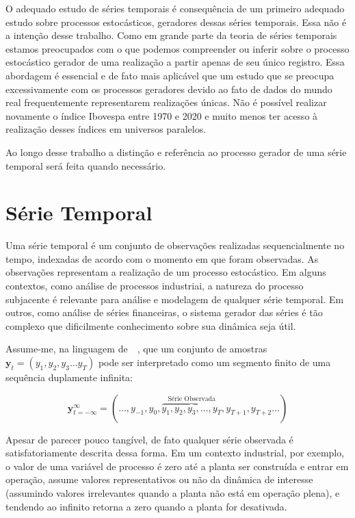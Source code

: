 O adequado estudo de séries temporais é consequência de um primeiro adequado
estudo sobre processos estocásticos, geradores dessas séries temporais. Essa
não é a intenção desse trabalho. Como em grande parte da teoria de séries
temporais estamos preocupados com o que podemos compreender ou inferir sobre
o processo estocástico gerador de uma realização a partir apenas de seu único
registro. Essa abordagem é essencial e de fato mais aplicável que um estudo
que se preocupa excessivamente com os processos geradores devido ao fato de dados
do mundo real frequentemente representarem realizações únicas. Não é possível
realizar novamente o índice Ibovespa entre 1970 e 2020 e muito menos ter acesso
à realização desses índices em universos paralelos.

Ao longo desse trabalho a distinção e referência ao processo gerador de uma série
temporal será feita quando necessário.


\section{Série Temporal}\label{ssec:definition}

Uma série temporal é um conjunto de observações realizadas sequencialmente no
tempo, indexadas de acordo com o momento em que foram observadas. As
observações representam a realização de um processo estocástico. Em alguns
contextos, como análise de processos industriai, a natureza do processo
subjacente é relevante para análise e modelagem de qualquer série temporal. Em
outros, como análise de séries financeiras, o sistema gerador das séries é tão
complexo que dificilmente conhecimento sobre sua dinâmica seja útil.

Assume-me, na linguagem de~~\cite{hamilton}, que um conjunto de amostras
$\mathbf{y}_t = (y_1, y_2, y_3 \dots y_T)$ pode ser interpretado como um
segmento finito de uma sequência duplamente infinita:

$${\mathbf{y}}_{t=-\infty}^{\infty} = ({\dots, y_{-1},y_0, \overbrace{y_1, y_2, y_3, \dots, y_T}^{\text{Série Observada}}, y_{T+1}, y_{T+2}}\dots)$$

\vspace{1cm}

Apesar de parecer pouco tangível, de fato qualquer série observada é
satisfatoriamente descrita dessa forma. Em um contexto industrial, por exemplo,
o valor de uma variável de processo é zero até a planta ser construída e entrar
em operação, assume valores representativos ou não da dinâmica de interesse
(assumindo valores irrelevantes quando a planta não está em operação plena), e
tendendo ao infinito retorna a zero quando a planta for desativada.

